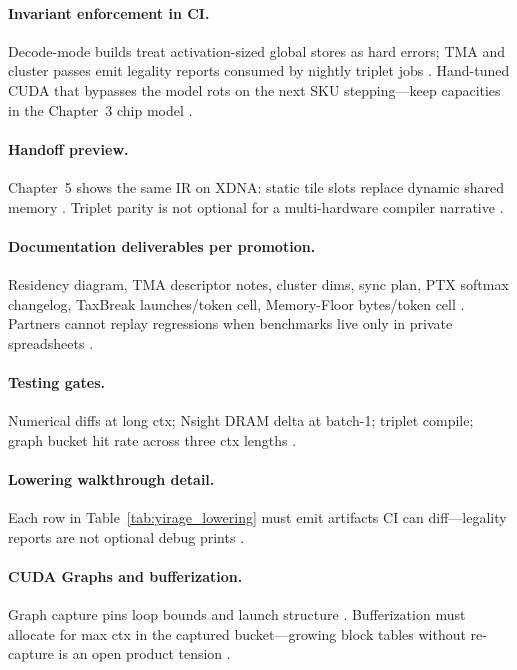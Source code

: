 \paragraph{Invariant enforcement in CI.}
Decode-mode builds treat activation-sized global stores as hard errors; TMA and cluster passes emit legality reports consumed by nightly triplet jobs \citep{yirage2026,amd2024xdna,chen2020compilerbasedhardw}.
Hand-tuned CUDA that bypasses the model rots on the next SKU stepping---keep capacities in the Chapter~3 chip model \citep{patel2025llminference,iree2024}.

\paragraph{Handoff preview.}
Chapter~5 shows the same IR on XDNA: static tile slots replace dynamic shared memory \citep{amd2024xdna,amd2024aie}.
Triplet parity is not optional for a multi-hardware compiler narrative \citep{yirage2026,patel2025llminference}.

\paragraph{Documentation deliverables per promotion.}
Residency diagram, TMA descriptor notes, cluster dims, sync plan, PTX softmax changelog, TaxBreak launches/token cell, Memory-Floor bytes/token cell \citep{taxbreak2026,memoryfloor2026,yirage2026,patel2025llminference}.
Partners cannot replay regressions when benchmarks live only in private spreadsheets \citep{chen2020compilerbasedhardw}.

\paragraph{Testing gates.}
Numerical diffs at long ctx; Nsight DRAM delta at batch-1; triplet compile; graph bucket hit rate across three ctx lengths \citep{dao2023flashdecoding,nvidia2024cudagraphs,amd2024xdna,yirage2026}.

\paragraph{Lowering walkthrough detail.}
Each row in Table~\ref{tab:yirage_lowering} must emit artifacts CI can diff---legality reports are not optional debug prints \citep{yirage2026,chen2020compilerbasedhardw}.

\paragraph{CUDA Graphs and bufferization.}
Graph capture pins loop bounds and launch structure \citep{nvidia2024cudagraphs,kwon2023vllm}.
Bufferization must allocate for max ctx in the captured bucket---growing block tables without re-capture is an open product tension \citep{patel2025llminference,yirage2026,liu2024deepseekv3}.

